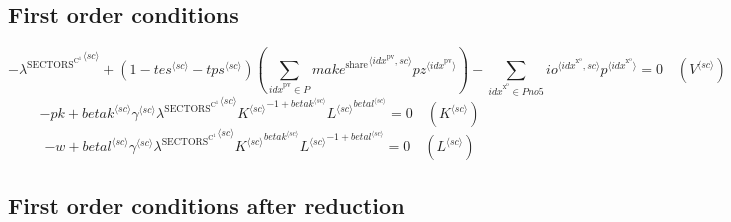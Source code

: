 \subsection{First order conditions}

\begin{equation}
-{\lambda^{\mathrm{SECTORS}^{\mathrm{C}^{\mathrm{1}}}}}^{\langle {s\!c}\rangle} + \left(1 - {{t\!e\!s}}^{\langle {s\!c}\rangle} - {{t\!p\!s}}^{\langle {s\!c}\rangle}\right) \left(\sum_{{i\!d\!x}^{\mathrm{pv}}\in P} {{{m\!a\!k\!e}^{\mathrm{share}}}^{\langle {i\!d\!x}^{\mathrm{pv}},{s\!c}\rangle}} {{{p\!z}}^{\langle {i\!d\!x}^{\mathrm{pv}}\rangle}}\right) - \sum_{{i\!d\!x}^{\mathrm{x}^{\mathrm{o}}}\in {P\!n\!o\!5}} {{{i\!o}}^{\langle {i\!d\!x}^{\mathrm{x}^{\mathrm{o}}},{s\!c}\rangle}} {{p}^{\langle {i\!d\!x}^{\mathrm{x}^{\mathrm{o}}}\rangle}} = 0
 \quad \left({V}^{\langle {s\!c}\rangle}\right)
\end{equation}
\begin{equation}
-{p\!k} + {{{b\!e\!t\!a\!k}}^{\langle {s\!c}\rangle}} {{\gamma}^{\langle {s\!c}\rangle}} {{\lambda^{\mathrm{SECTORS}^{\mathrm{C}^{\mathrm{1}}}}}^{\langle {s\!c}\rangle}} {{{K}^{\langle {s\!c}\rangle}}^{-1 + {{b\!e\!t\!a\!k}}^{\langle {s\!c}\rangle}}} {{{L}^{\langle {s\!c}\rangle}}^{{{b\!e\!t\!a\!l}}^{\langle {s\!c}\rangle}}} = 0
 \quad \left({K}^{\langle {s\!c}\rangle}\right)
\end{equation}
\begin{equation}
-w + {{{b\!e\!t\!a\!l}}^{\langle {s\!c}\rangle}} {{\gamma}^{\langle {s\!c}\rangle}} {{\lambda^{\mathrm{SECTORS}^{\mathrm{C}^{\mathrm{1}}}}}^{\langle {s\!c}\rangle}} {{{K}^{\langle {s\!c}\rangle}}^{{{b\!e\!t\!a\!k}}^{\langle {s\!c}\rangle}}} {{{L}^{\langle {s\!c}\rangle}}^{-1 + {{b\!e\!t\!a\!l}}^{\langle {s\!c}\rangle}}} = 0
 \quad \left({L}^{\langle {s\!c}\rangle}\right)
\end{equation}


\subsection{First order conditions after reduction}

